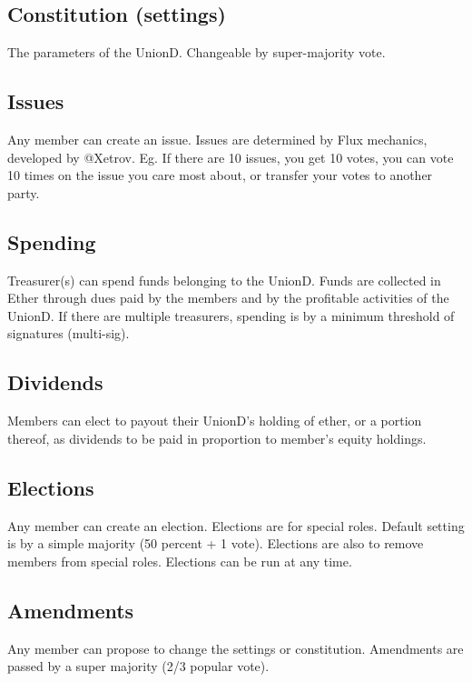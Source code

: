 \documentclass[12pt,twocolumn]{article}
\begin{document}
\subsection{Constitution (settings)}

The parameters of the UnionD. Changeable by super-majority vote.

\subsection{Issues}

Any member can create an issue. Issues are determined by Flux mechanics, developed by @Xetrov. Eg. If there are 10 issues, you get 10 votes, you can vote 10 times on the issue you care most about, or transfer your votes to another party.

\subsection{Spending}

Treasurer(s) can spend funds belonging to the UnionD. Funds are collected in Ether through dues paid by the members and by the profitable activities of the UnionD. If there are multiple treasurers, spending is by a minimum threshold of signatures (multi-sig).

\subsection{Dividends}

Members can elect to payout their UnionD's holding of ether, or a portion thereof, as dividends to be paid in proportion to member's equity holdings.

\subsection{Elections}

Any member can create an election. Elections are for special roles. Default setting is by a simple majority (50 percent + 1 vote). Elections are also to remove members from special roles. Elections can be run at any time.

\subsection{Amendments}

Any member can propose to change the settings or constitution. Amendments are passed by a super majority (2/3 popular vote).
\end{document}
